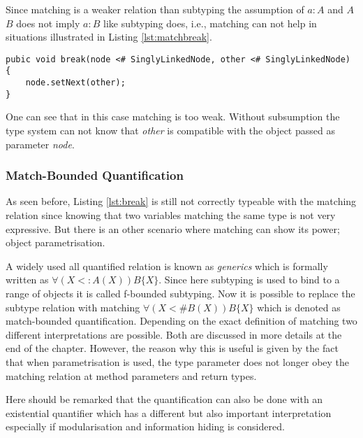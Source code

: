 Since matching is a weaker relation than subtyping the assumption of $a:A$
and $A$ \match $B$ does not imply $a:B$ like subtyping does, i.e., matching
can not help in situations illustrated in Listing \ref{lst:matchbreak}.

\begin{lstlisting}[float,label={lst:matchbreak},caption={Matching relation in the break method}]
pubic void break(node <# SinglyLinkedNode, other <# SinglyLinkedNode) {
	node.setNext(other);
}
\end{lstlisting}

One can see that in this case matching is too weak. Without subsumption
the type system can not know that \emph{other} is compatible with the
object passed as parameter \emph{node}.

\subsubsection{Match-Bounded Quantification}
As seen before, Listing \ref{lst:break} is still not correctly typeable
with the matching relation since knowing that two variables matching
the same type is not very expressive. But there is an other scenario
where matching can show its power; object parametrisation.

A widely used all quantified relation is known as \emph{generics}
which is formally written as $\forall (X <: A(X))B\{X\}$. Since here
subtyping is used to bind \X to a range of objects it is called f-bounded
subtyping. Now it is possible to replace the subtype relation with
matching $\forall(X <\# B(X))B\{X\}$ which is denoted as match-bounded
quantification. Depending on the exact definition of matching two
different interpretations are possible\cite{abadi_subtyping_1996}. Both
are discussed in more details at the end of the chapter. However, the
reason why this is useful is given by the fact that when parametrisation
is used, the type parameter does not longer obey the matching relation
at method parameters and return types.

Here should be remarked that the quantification can also be done with an
existential quantifier which has a different but also important
interpretation especially if modularisation and information hiding is
considered\cite{cameron_existential_2009,pierce_types_2002}.

